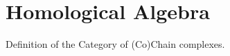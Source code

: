 \documentclass[12pt]{article}
\begin{document}
\section{Homological Algebra}

\begin{remark}
Definition of the Category of (Co)Chain complexes. 
\end{remark}
\end{document}
